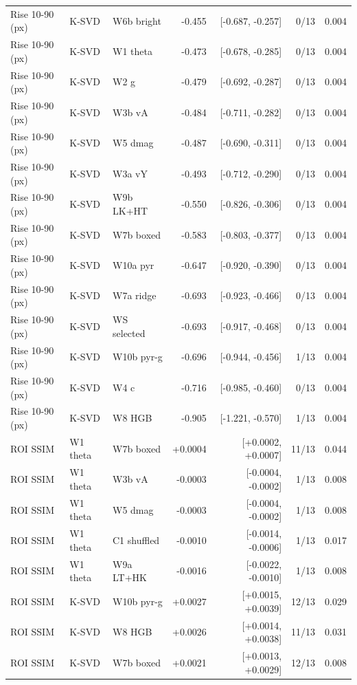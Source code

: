 \begin{tabular}{lllrrrr}
Rise 10-90 (px) & K-SVD & W6b bright & -0.455 & [-0.687, -0.257] & 0/13 & 0.004 \\
Rise 10-90 (px) & K-SVD & W1 theta & -0.473 & [-0.678, -0.285] & 0/13 & 0.004 \\
Rise 10-90 (px) & K-SVD & W2 g & -0.479 & [-0.692, -0.287] & 0/13 & 0.004 \\
Rise 10-90 (px) & K-SVD & W3b vA & -0.484 & [-0.711, -0.282] & 0/13 & 0.004 \\
Rise 10-90 (px) & K-SVD & W5 dmag & -0.487 & [-0.690, -0.311] & 0/13 & 0.004 \\
Rise 10-90 (px) & K-SVD & W3a vY & -0.493 & [-0.712, -0.290] & 0/13 & 0.004 \\
Rise 10-90 (px) & K-SVD & W9b LK+HT & -0.550 & [-0.826, -0.306] & 0/13 & 0.004 \\
Rise 10-90 (px) & K-SVD & W7b boxed & -0.583 & [-0.803, -0.377] & 0/13 & 0.004 \\
Rise 10-90 (px) & K-SVD & W10a pyr & -0.647 & [-0.920, -0.390] & 0/13 & 0.004 \\
Rise 10-90 (px) & K-SVD & W7a ridge & -0.693 & [-0.923, -0.466] & 0/13 & 0.004 \\
Rise 10-90 (px) & K-SVD & WS selected & -0.693 & [-0.917, -0.468] & 0/13 & 0.004 \\
Rise 10-90 (px) & K-SVD & W10b pyr-g & -0.696 & [-0.944, -0.456] & 1/13 & 0.004 \\
Rise 10-90 (px) & K-SVD & W4 c & -0.716 & [-0.985, -0.460] & 0/13 & 0.004 \\
Rise 10-90 (px) & K-SVD & W8 HGB & -0.905 & [-1.221, -0.570] & 1/13 & 0.004 \\
ROI SSIM & W1 theta & W7b boxed & +0.0004 & [+0.0002, +0.0007] & 11/13 & 0.044 \\
ROI SSIM & W1 theta & W3b vA & -0.0003 & [-0.0004, -0.0002] & 1/13 & 0.008 \\
ROI SSIM & W1 theta & W5 dmag & -0.0003 & [-0.0004, -0.0002] & 1/13 & 0.008 \\
ROI SSIM & W1 theta & C1 shuffled & -0.0010 & [-0.0014, -0.0006] & 1/13 & 0.017 \\
ROI SSIM & W1 theta & W9a LT+HK & -0.0016 & [-0.0022, -0.0010] & 1/13 & 0.008 \\
ROI SSIM & K-SVD & W10b pyr-g & +0.0027 & [+0.0015, +0.0039] & 12/13 & 0.029 \\
ROI SSIM & K-SVD & W8 HGB & +0.0026 & [+0.0014, +0.0038] & 11/13 & 0.031 \\
ROI SSIM & K-SVD & W7b boxed & +0.0021 & [+0.0013, +0.0029] & 12/13 & 0.008 \\

\end{tabular}
